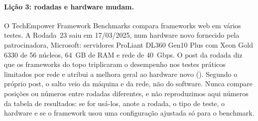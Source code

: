 \paragraph{Lição 3: rodadas e hardware mudam.}
O TechEmpower Framework Benchmarks compara frameworks web em vários
testes. A Rodada~23 saiu em 17/03/2025, num hardware novo fornecido pela patrocinadora,
Microsoft: servidores ProLiant DL360 Gen10 Plus com Xeon Gold 6330 de 56
núcleos, 64~GB de RAM e rede de 40~Gbps. O post da rodada diz que os
frameworks do topo triplicaram o desempenho nos testes práticos limitados
por rede e atribui a melhora geral ao hardware novo
(). Segundo o próprio post, o salto
veio da máquina e da rede, não do software. Nunca compare posições ou números entre
rodadas diferentes, e não reproduzimos aqui números da tabela de
resultados: se for usá-los, anote a rodada, o tipo de teste, o hardware
e se o framework usou uma configuração ajustada só para o benchmark.
